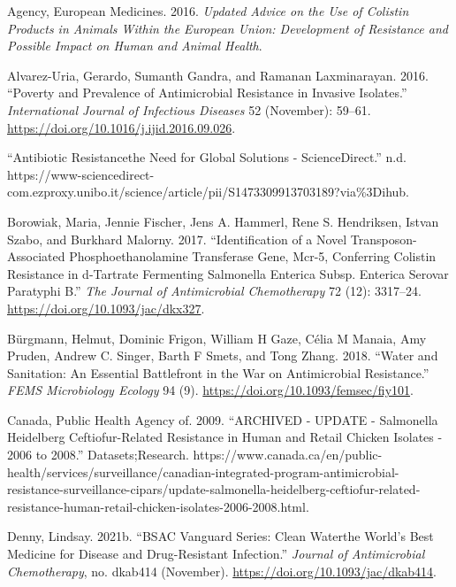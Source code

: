 \documentclass[]{tufte-handout}
\newlength{\cslhangindent}
\newenvironment{CSLReferences}[3] %
 {%
  \setlength{\parindent}{0pt}
  \ifodd #1 \everypar{\setlength{\hangindent}{\cslhangindent}}\ignorespaces\fi
  \ifnum #2 > 0
  \setlength{\parskip}{#2\baselineskip}
  \fi
 }%
 {}
\begin{document}
\hypertarget{refs}{}
\begin{CSLReferences}{1}{0}
\leavevmode{}%
Agency, European Medicines. 2016. \emph{Updated Advice on the Use of
Colistin Products in Animals Within the {European Union}: Development of
Resistance and Possible Impact on Human and Animal Health}.

\leavevmode{}%
Alvarez-Uria, Gerardo, Sumanth Gandra, and Ramanan Laxminarayan. 2016.
{``Poverty and Prevalence of Antimicrobial Resistance in Invasive
Isolates.''} \emph{International Journal of Infectious Diseases} 52
(November): 59--61. \url{https://doi.org/10.1016/j.ijid.2016.09.026}.

\leavevmode{}%
{``Antibiotic Resistance\textemdash the Need for Global Solutions -
{ScienceDirect}.''} n.d.
https://www-sciencedirect-com.ezproxy.unibo.it/science/article/pii/S1473309913703189?via\%3Dihub.

\leavevmode{}%
Borowiak, Maria, Jennie Fischer, Jens A. Hammerl, Rene S. Hendriksen,
Istvan Szabo, and Burkhard Malorny. 2017. {``Identification of a Novel
Transposon-Associated Phosphoethanolamine Transferase Gene, Mcr-5,
Conferring Colistin Resistance in d-Tartrate Fermenting {Salmonella}
Enterica Subsp. Enterica Serovar {Paratyphi B}.''} \emph{The Journal of
Antimicrobial Chemotherapy} 72 (12): 3317--24.
\url{https://doi.org/10.1093/jac/dkx327}.

\leavevmode{}%
Bürgmann, Helmut, Dominic Frigon, William H Gaze, Célia M Manaia, Amy
Pruden, Andrew C. Singer, Barth F Smets, and Tong Zhang. 2018. {``Water
and Sanitation: An Essential Battlefront in the War on Antimicrobial
Resistance.''} \emph{FEMS Microbiology Ecology} 94 (9).
\url{https://doi.org/10.1093/femsec/fiy101}.

\leavevmode{}%
Canada, Public Health Agency of. 2009. {``{ARCHIVED} - {UPDATE} -
{Salmonella Heidelberg Ceftiofur}-{Related Resistance} in {Human} and
{Retail Chicken Isolates} - 2006 to 2008.''} Datasets;Research.
https://www.canada.ca/en/public-health/services/surveillance/canadian-integrated-program-antimicrobial-resistance-surveillance-cipars/update-salmonella-heidelberg-ceftiofur-related-resistance-human-retail-chicken-isolates-2006-2008.html.

\leavevmode{}%
Denny, Lindsay. 2021b. {``{BSAC Vanguard Series}: Clean
Water\textemdash the World's Best Medicine for Disease and
Drug-Resistant Infection.''} \emph{Journal of Antimicrobial
Chemotherapy}, no. dkab414 (November).
\url{https://doi.org/10.1093/jac/dkab414}.


\end{CSLReferences}
\end{document}
